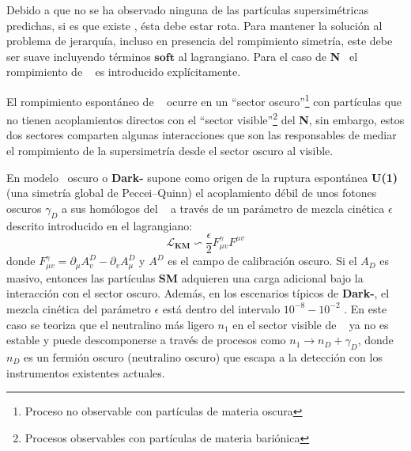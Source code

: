 Debido a que no se ha observado ninguna de las partículas supersimétricas predichas, si es que existe \SUSY, ésta debe estar rota. Para mantener la solución al problema de jerarquía, incluso en presencia del rompimiento simetría, este debe ser suave incluyendo términos $\mathbf{soft}$ al lagrangiano. Para el caso de \textbf{N}\MSSM ~ el rompimiento de \SUSY ~ es introducido explícitamente. %

El rompimiento espontáneo de \SUSY ~ ocurre en un ``sector oscuro''\footnote{Proceso no observable con partículas de materia oscura} con partículas que no tienen acoplamientos directos con el %
``sector visible''\footnote{Procesos observables con partículas de materia bariónica} del \textbf{N}\MSSM, sin embargo, estos dos sectores comparten algunas interacciones que son las responsables de mediar el rompimiento de la supersimetría desde el sector oscuro al visible.

En modelo \SUSY ~oscuro o \textbf{Dark-\SUSY} supone como origen de la ruptura espontánea \textbf{U(1)} (una simetría global de Peccei–Quinn) el acoplamiento débil de unos fotones oscuros $\gamma_D$ a sus homólogos del \ME ~ a través de un parámetro de mezcla cinética $\epsilon$ descrito introducido en el lagrangiano:
\begin{equation}
\mathcal{L}_\mathbf{KM}\backsim \dfrac{\epsilon}{2} F_{\mu v}^{\gamma} F^{\mu v}
\end{equation}
donde $F_{\mu v}^{\gamma} = \partial_\mu A_v^{D} -\partial_v A_\mu^D$ y $A^D$ es el campo de calibración oscuro. Si el $A_D$ es masivo, entonces las partículas \textbf{SM} adquieren una carga adicional bajo la interacción con el sector oscuro. Además, en los escenarios típicos de \textbf{Dark-\SUSY}, el mezcla cinética del parámetro $\epsilon$ está dentro del intervalo $10^{-8}-10^{-2}$ \citep{cms_collaboration_search_2019-1}. En este caso se teoriza que el neutralino más ligero $n_1$ en el sector visible de \SUSY ~ ya no es estable y puede descomponerse a través de procesos como $n_1\longrightarrow  n_D + \gamma_D$, donde $n_D$ es un fermión oscuro (neutralino oscuro) que escapa a la detección con los instrumentos existentes actuales. 

